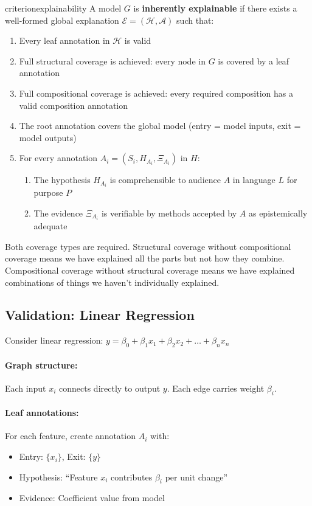 \documentclass{article}
\begin{document}
\begin{restatable}{criterion}{explainability}
A model $G$ is \textbf{inherently explainable} if there exists a well-formed global explanation $\mathcal{E} = (\mathcal{H}, \mathcal{A})$ such that:
\begin{enumerate}
    \item Every leaf annotation in $\mathcal{H}$ is valid
    \item Full structural coverage is achieved: every node in $G$ is covered by a leaf annotation
    \item Full compositional coverage is achieved: every required composition has a valid composition annotation
    \item The root annotation covers the global model (entry = model inputs, exit = model outputs)
    \item For every annotation $A_i = (S_i, H_{A_i}, \Xi_{A_i})$ in $H$:
    \begin{enumerate}
        \item The hypothesis $H_{A_i}$ is comprehensible to audience $A$ in language $L$ for purpose $P$
        \item The evidence $\Xi_{A_i}$ is verifiable by methods accepted by $A$ as epistemically adequate
    \end{enumerate}

\end{enumerate}
\end{restatable}

Both coverage types are required. Structural coverage without compositional coverage means we have explained all the parts but not how they combine. Compositional coverage without structural coverage means we have explained combinations of things we haven't individually explained.

\subsection{Validation: Linear Regression}

Consider linear regression: $y = \beta_0 + \beta_1 x_1 + \beta_2 x_2 + \ldots + \beta_n x_n$

\paragraph{Graph structure:} Each input $x_i$ connects directly to output $y$. Each edge carries weight $\beta_i$.

\paragraph{Leaf annotations:} For each feature, create annotation $A_i$ with:
\begin{itemize}
    \item Entry: $\{x_i\}$, Exit: $\{y\}$
    \item Hypothesis: ``Feature $x_i$ contributes $\beta_i$ per unit change''
    \item Evidence: Coefficient value from model
\end{itemize}
\end{document}
